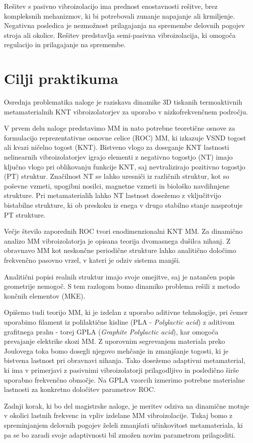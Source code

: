     Rešitev s pasivno vibroizolacijo ima prednost enostavnosti rešitve, brez kompleksnih mehanizmov, ki bi potrebovali zunanje napajanje ali krmiljenje. Negativna posledica je nezmožnost prilagajanja na spremembe delovnih pogojev stroja ali okolice. Rešitev predstavlja semi-pasivna vibroizolacija, ki omogoča regulacijo in prilagajanje na spremembe. 


\section{Cilji praktikuma}\label{sec:cilji_naloge}

    Osrednja problematika naloge je raziskava dinamike 3D tiskanih termoaktivnih metamaterialnih KNT vibroizolatorjev za uporabo v nizkofrekvenčnem področju.
    
    V prvem delu naloge predstavimo MM in nato potrebne teoretične osnove za formulacijo reprezentativne osnovne celice (ROC) MM, ki izkazuje VSND togost ali kvazi ničelno togost (KNT). Bistveno vlogo za doseganje KNT lastnosti nelinearnih vibroizolatorjev igrajo elementi z negativno togostjo (NT) imajo ključno vlogo pri oblikovanju funkcije KNT, saj nevtralizirajo pozitivno togostjo (PT) struktur. Značilnost NT se lahko uresniči iz različnih struktur, kot so poševne vzmeti, upogibni nosilci, magnetne vzmeti in biološko navdihnjene strukture. Pri metamaterialih lahko NT lastnost dosežemo z vključitvijo bistabilne strukture, ki ob preskoku iz enega v drugo stabilno stanje nasprotuje PT strukture.
    
    Večje število zaporednih ROC tvori enodimenzionalni KNT MM. Za dinamično analizo MM vibroizolatorja je opisana teorija dvomasnega dušilca nihanj. Z obravnavo MM kot neskončne periodične strukture lahko analitično določimo frekvenčno pasovno vrzel, v kateri je odziv sistema manjši. 
    
    Analitični popisi realnih struktur imajo svoje omejitve, saj je natančen popis geometrije nemogoč. S tem razlogom bomo dinamiko problema rešili z metodo končnih elementov (MKE). 
    
    Opišemo tudi teorijo MM, ki je izdelan z uporabo aditivne tehnologije, pri čemer uporabimo filament iz polilaktične kisline (PLA - \textit{Polylactic acid}) z aditivom grafitnega prahu - torej GPLA (\textit{Graphite Polylactic acid}), kar omogoča prevajanje elektrike skozi MM. Z uporovnim segrevanjem materiala preko Joulovega toka bomo dosegli njegovo mehčanje in zmanjšanje togosti, ki je bistvena lastnost pri obravnavi nihanja. Tako dosežemo adaptivni metamaterial, ki ima v primerjavi z pasivnimi vibroizolatorji prilagodljivo in posledično širše uporabno frekvenčno območje. Na GPLA vzorcih izmerimo potrebne materialne lastnosti za konkretno določitev parametrov ROC.
        
    Zadnji korak, ki bo del magistrske naloge, je meritev odziva na dinamične motnje v okolici lastnih frekvenc in vpliv izdelane MM vibroizolacije. Tukaj bomo z spreminjanjem delovnih pogojev želeli zmanjšati učinkovitost metamateriala, ki pa se bo zaradi svoje adaptivnosti bil zmožen novim parametrom prilagoditi.



